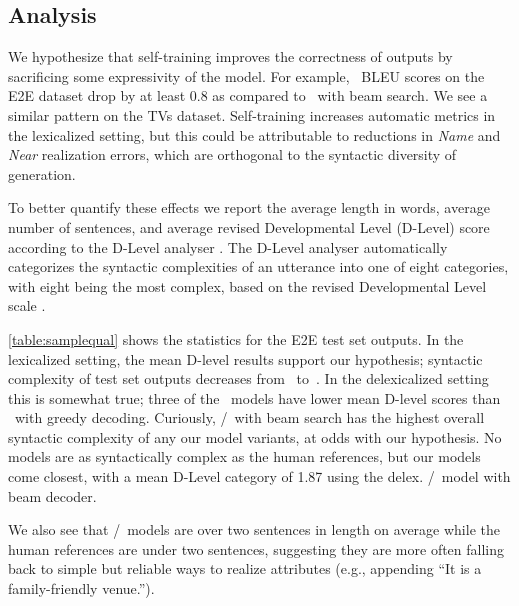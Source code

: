 




\subsection{Analysis}

We hypothesize that self-training improves the correctness of outputs
by sacrificing some expressivity of the model. For example, 
\auggen~BLEU scores
on the E2E dataset drop by at least 0.8 as compared to \basegen~with beam
search. We see a similar pattern on the TVs dataset. Self-training
increases automatic metrics in the lexicalized setting, but this could 
be attributable to reductions  in \textit{Name} and \textit{Near}
realization errors, which are orthogonal to the 
syntactic diversity of generation.

To better quantify these effects we report the average length in words, 
average number of sentences, and average revised Developmental Level (D-Level)
score according to the D-Level analyser \cite{lu2009automatic}.
The D-Level analyser automatically categorizes the syntactic complexities 
of an utterance into one of eight categories, with eight being the most
complex, based on the revised Developmental Level scale \cite{rosenberg1987indicators,covington2006complex}.


\autoref{table:samplequal} shows the statistics for the E2E test set outputs. 
In the lexicalized setting, the mean D-level results support our hypothesis;
syntactic complexity of test set outputs decreases from \basegen~to~\auggen.
In the delexicalized setting this is somewhat true; three of 
the \auggen~models have lower mean D-level scores than \basegen~with 
greedy decoding. Curiously, \auggen/\learnedclf~with beam search has the 
highest overall syntactic complexity of any our model variants, at odds
with our hypothesis.
No models are as syntactically complex as the human references, but our
models come closest, with a mean D-Level category of 1.87 using the delex. \auggen/\learnedclf~model with beam decoder. %


We  also 
see that \auggen/~models %
are over two sentences
in length on average while the human references are under two sentences,
suggesting they are more often falling back to simple but reliable
ways to realize attributes (e.g., appending ``It is a family-friendly venue.'').


